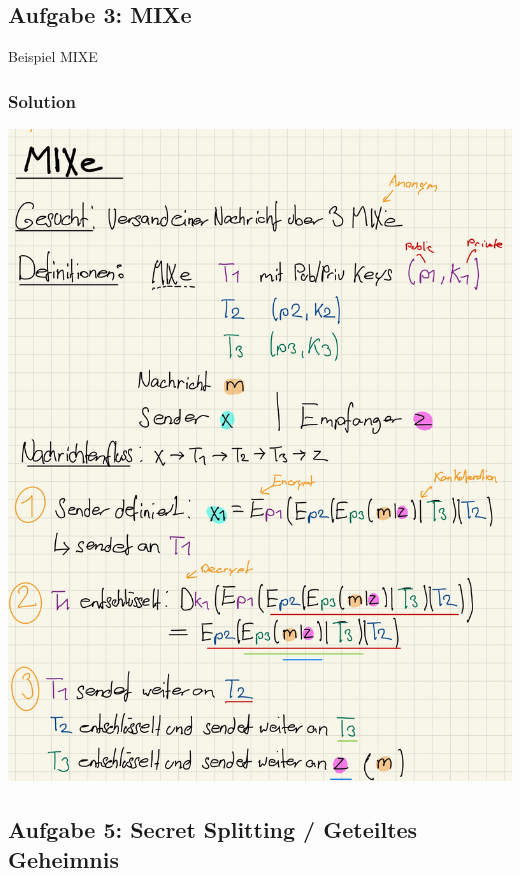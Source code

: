 \documentclass[11pt]{article}
\begin{document}
    \hypertarget{aufgabe-3-mixe}{%
\subsection{Aufgabe 3: MIXe}\label{aufgabe-3-mixe}}

Beispiel MIXE

\hypertarget{solution}{%
\subsubsection{Solution}\label{solution}}

\begin{center}
	\includegraphics{img/mixe.jpg}
\end{center}

\newpage

    \hypertarget{aufgabe-5-secret-splitting-geteiltes-geheimnis}{%
\subsection{Aufgabe 5: Secret Splitting / Geteiltes
Geheimnis}\label{aufgabe-5-secret-splitting-geteiltes-geheimnis}}
\end{document}
